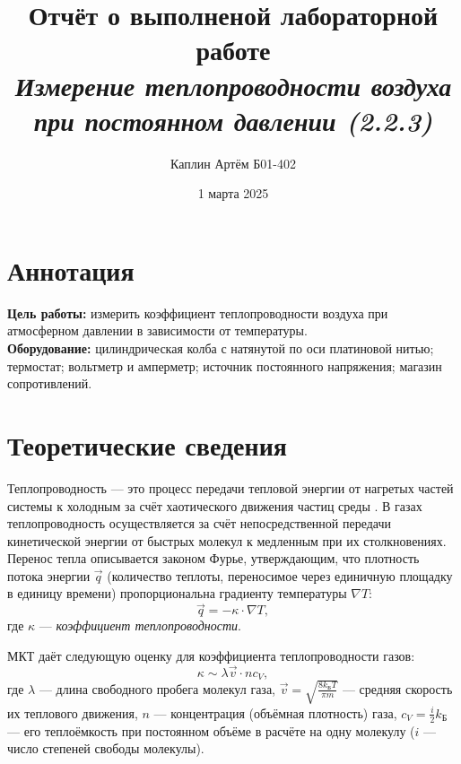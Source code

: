 \documentclass[a4paper,12pt]{article}
\title{\textbf{Отчёт о выполненой лабораторной работе \\ \textit{Измерение теплопроводности
воздуха при постоянном давлении (2.2.3)}}}
\author{Каплин Артём Б01-402}
\date{1 марта 2025}
\begin{document}
\maketitle

	\section{Аннотация}

	\textbf{Цель работы:} измерить коэффициент теплопроводности воздуха при атмосферном
        давлении в зависимости от температуры. \\
\newline
	\textbf{Оборудование:}  цилиндрическая колба с натянутой по оси платиновой нитью; термостат;
        вольтметр и амперметр; источник
        постоянного напряжения; магазин сопротивлений.

	\section{Теоретические сведения}

        Теплопроводность — это процесс передачи тепловой энергии от нагретых
частей системы к холодным за счёт хаотического движения частиц среды . В газах теплопроводность осуществляется за счёт непосредственной передачи кинетической энергии от быстрых молекул к медленным при их столкновениях. Перенос тепла описывается законом Фурье, утверждающим, что плотность потока энергии $\vec{q}$ (количество теплоты, переносимое через единичную площадку в единицу времени) пропорциональна градиенту температуры $\nabla T$:
\[
\vec{q} = -\kappa \cdot \nabla T, \tag{1} \label{1}
\]
где $\kappa$ — \textit{коэффициент теплопроводности}.

МКТ даёт следующую оценку для коэффициента теплопроводности газов:
\[
\kappa \sim \lambda \vec{v} \cdot n c_V, \tag{2}
\]
где $\lambda$ — длина свободного пробега молекул газа, $ \vec{v} = \sqrt{\frac{8 k_{\text{Б}} T}{\pi m}}$ — средняя скорость их теплового движения, $n$ — концентрация (объёмная плотность) газа, $c_V = \frac{i}{2} k_{\text{Б}}$
— его теплоёмкость при постоянном объёме в расчёте на одну молекулу ($i$ — число степеней свободы молекулы).
\end{document}
